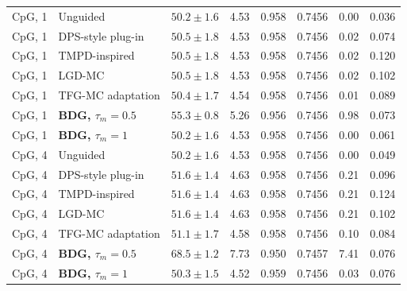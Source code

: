 \documentclass{article}
\begin{document}
\begin{table}[!htbp]
\begin{tabular}{llcccccc}
\midrule
CpG, 1 & Unguided & $50.2\pm1.6$ & 4.53 & 0.958 & 0.7456 & 0.00 & 0.036\\
CpG, 1 & DPS-style plug-in & $50.5\pm1.8$ & 4.53 & 0.958 & 0.7456 & 0.02 & 0.074\\
CpG, 1 & TMPD-inspired & $50.5\pm1.8$ & 4.53 & 0.958 & 0.7456 & 0.02 & 0.120\\
CpG, 1 & LGD-MC & $50.5\pm1.8$ & 4.53 & 0.958 & 0.7456 & 0.02 & 0.102\\
CpG, 1 & TFG-MC adaptation & $50.4\pm1.7$ & 4.54 & 0.958 & 0.7456 & 0.01 & 0.089\\
CpG, 1 & \textbf{BDG, $\tau_m=0.5$} & $55.3\pm0.8$ & 5.26 & 0.956 & 0.7456 & 0.98 & 0.073\\
CpG, 1 & \textbf{BDG, $\tau_m=1$} & $50.2\pm1.6$ & 4.53 & 0.958 & 0.7456 & 0.00 & 0.061\\
\midrule
CpG, 4 & Unguided & $50.2\pm1.6$ & 4.53 & 0.958 & 0.7456 & 0.00 & 0.049\\
CpG, 4 & DPS-style plug-in & $51.6\pm1.4$ & 4.63 & 0.958 & 0.7456 & 0.21 & 0.096\\
CpG, 4 & TMPD-inspired & $51.6\pm1.4$ & 4.63 & 0.958 & 0.7456 & 0.21 & 0.124\\
CpG, 4 & LGD-MC & $51.6\pm1.4$ & 4.63 & 0.958 & 0.7456 & 0.21 & 0.102\\
CpG, 4 & TFG-MC adaptation & $51.1\pm1.7$ & 4.58 & 0.958 & 0.7456 & 0.10 & 0.084\\
CpG, 4 & \textbf{BDG, $\tau_m=0.5$} & $68.5\pm1.2$ & 7.73 & 0.950 & 0.7457 & 7.41 & 0.076\\
CpG, 4 & \textbf{BDG, $\tau_m=1$} & $50.3\pm1.5$ & 4.52 & 0.959 & 0.7456 & 0.03 & 0.076\\
\bottomrule
\end{tabular}
\end{table}
\clearpage
\end{document}
